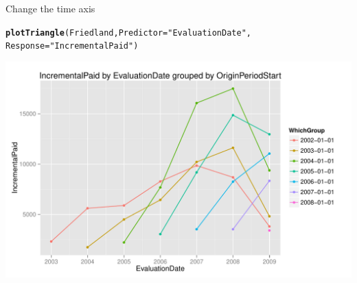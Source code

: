 \documentclass[xcolor=dvipsnames]{beamer}\usepackage{graphicx, color}
\makeatletter
\def\maxwidth{ %
  \ifdim\Gin@nat@width>\linewidth
    \linewidth
  \else
    \Gin@nat@width
  \fi
}
\newcommand{\hlfunctioncall}[1]{\textcolor[rgb]{0.501960784313725,0,0.329411764705882}{\textbf{#1}}}%
\newcommand{\hlstring}[1]{\textcolor[rgb]{0.6,0.6,1}{#1}}%
\newenvironment{kframe}{%
 \def\at@end@of@kframe{}%
 \ifinner\ifhmode%
  \def\at@end@of@kframe{\end{minipage}}%
  \begin{minipage}{\columnwidth}%
 \fi\fi%
 \def\FrameCommand##1{\hskip\@totalleftmargin \hskip-\fboxsep
 \colorbox{shadecolor}{##1}\hskip-\fboxsep
     \hskip-\linewidth \hskip-\@totalleftmargin \hskip\columnwidth}%
 \MakeFramed {\advance\hsize-\width
   \@totalleftmargin\z@ \linewidth\hsize
   \@setminipage}}%
 {\par\unskip\endMakeFramed%
 \at@end@of@kframe}
\newenvironment{knitrout}{}{} %
\makeatother
\begin{document}
\begin{frame}[fragile]{Change the time axis}
\begin{knitrout}
\color{fgcolor}\begin{kframe}
\begin{alltt}
\hlfunctioncall{plotTriangle}(Friedland, Predictor = \hlstring{"EvaluationDate"}, 
    Response = \hlstring{"IncrementalPaid"})
\end{alltt}
\end{kframe}
\includegraphics[width=\maxwidth]{figure/Friedland3} 

\end{knitrout}

\end{frame}
\end{document}
